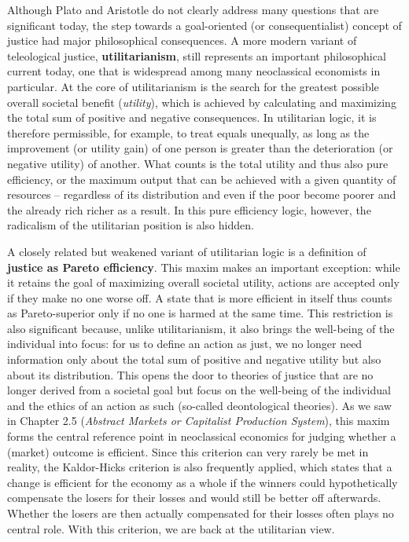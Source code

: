 \documentclass[
  british,
  a4paper,
  DIV=11,
  numbers=noendperiod,
  oneside,
  openany]{scrreprt}
\begin{document}
Although Plato and Aristotle do not clearly address many questions that
are significant today, the step towards a goal-oriented (or
consequentialist) concept of justice had major philosophical
consequences. A more modern variant of teleological justice,
\textbf{utilitarianism}, still represents an important philosophical
current today, one that is widespread among many neoclassical economists
in particular. At the core of utilitarianism is the search for the
greatest possible overall societal benefit (\emph{utility}), which is
achieved by calculating and maximizing the total sum of positive and
negative consequences. In utilitarian logic, it is therefore
permissible, for example, to treat equals unequally, as long as the
improvement (or utility gain) of one person is greater than the
deterioration (or negative utility) of another. What counts is the total
utility and thus also pure efficiency, or the maximum output that can be
achieved with a given quantity of resources -- regardless of its
distribution and even if the poor become poorer and the already rich
richer as a result. In this pure efficiency logic, however, the
radicalism of the utilitarian position is also hidden.

A closely related but weakened variant of utilitarian logic is a
definition of \textbf{justice as Pareto efficiency}. This maxim makes an
important exception: while it retains the goal of maximizing overall
societal utility, actions are accepted only if they make no one worse
off. A state that is more efficient in itself thus counts as
Pareto-superior only if no one is harmed at the same time. This
restriction is also significant because, unlike utilitarianism, it also
brings the well-being of the individual into focus: for us to define an
action as just, we no longer need information only about the total sum
of positive and negative utility but also about its distribution. This
opens the door to theories of justice that are no longer derived from a
societal goal but focus on the well-being of the individual and the
ethics of an action as such (so-called deontological theories). As we
saw in Chapter 2.5 (\emph{Abstract Markets or Capitalist Production
System}), this maxim forms the central reference point in neoclassical
economics for judging whether a (market) outcome is efficient. Since
this criterion can very rarely be met in reality, the Kaldor-Hicks
criterion is also frequently applied, which states that a change is
efficient for the economy as a whole if the winners could hypothetically
compensate the losers for their losses and would still be better off
afterwards. Whether the losers are then actually compensated for their
losses often plays no central role. With this criterion, we are back at
the utilitarian view.
\end{document}
